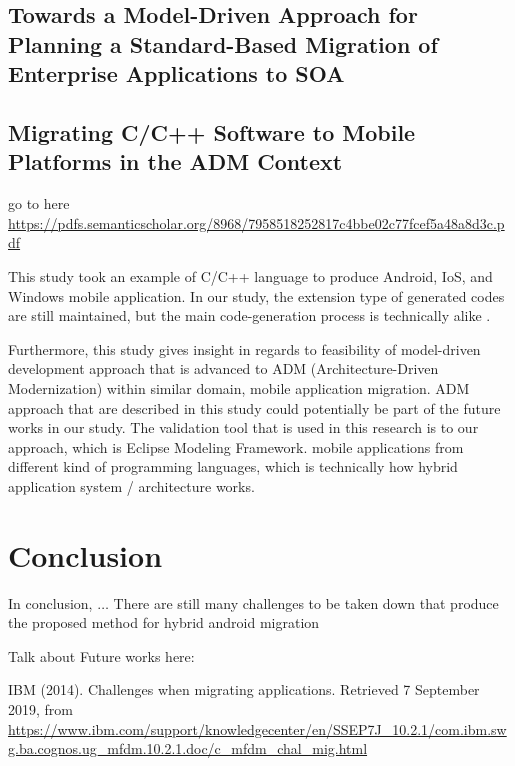 \documentclass[conference]{IEEEtran}
\begin{document}
\subsection{ Towards a Model-Driven Approach for Planning a Standard-Based Migration of Enterprise Applications to SOA }

\subsection{ Migrating C/C++ Software to Mobile Platforms in the ADM Context }
go to here \url{ https://pdfs.semanticscholar.org/8968/7958518252817c4bbe02c77fcef5a48a8d3c.pdf }

This study took an example of  C/C++ language to produce Android, IoS, and Windows mobile application. 
In our study, the extension type of generated codes are still maintained,
but the main code-generation process is technically alike . 

Furthermore, this study gives insight in regards to feasibility of model-driven development approach that is 
advanced to ADM (Architecture-Driven Modernization) within similar domain, mobile application migration. 
ADM approach that are described in this study could potentially be part of the future works in our study. 
The validation tool that is used in this research is to our approach, which is Eclipse Modeling Framework.
mobile applications from different kind of programming languages, which is technically 
how hybrid application system / architecture works. 


\section{Conclusion}

In conclusion, $\ldots$
There are still many challenges to be taken down that produce the proposed method for
hybrid android  migration 

Talk about Future works here:


\begin{thebibliography}{00}
 IBM (2014). Challenges when migrating applications. Retrieved 7 September 2019, from \url{https://www.ibm.com/support/knowledgecenter/en/SSEP7J_10.2.1/com.ibm.swg.ba.cognos.ug_mfdm.10.2.1.doc/c_mfdm_chal_mig.html}
\end{thebibliography}
\vspace{12pt}
\color{red}
\end{document}
